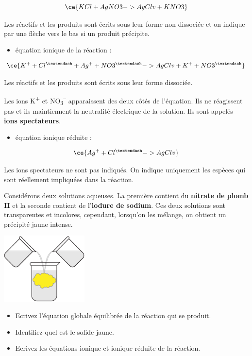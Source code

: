 \documentclass[
  11pt,
  french,
  a4paper,
  openany]{book}
\providecommand{\tightlist}{%
  \setlength{\itemsep}{0pt}\setlength{\parskip}{0pt}}
\begin{document}
\[ \ce{KCl + AgNO3 -> AgCl v + KNO3} \]

Les réactifs et les produits sont écrits sous leur forme non-dissociée et on indique par une flèche vers le bas si un produit précipite.

\begin{itemize}
\tightlist
\item
  équation ionique de la réaction :
\end{itemize}

\[ \ce{K^{+} + Cl^{–} + Ag^{+} + NO3^{–} -> AgCl v + K^{+} + NO3^{–}} \]

Les réactifs et les produits sont écrits sous leur forme dissociée.

Les ions K\textsuperscript{+} et NO\textsubscript{3}\textsuperscript{--} apparaissent des deux côtés de l'équation. Ils ne réagissent pas et ils maintiennent la neutralité électrique de la solution. Ils sont appelés \textbf{ions spectateurs}.

\begin{itemize}
\tightlist
\item
  équation ionique réduite :
\end{itemize}

\[ \ce{Ag^{+} + Cl^{–} -> AgCl v} \]

Les ions spectateurs ne sont pas indiqués. On indique uniquement les espèces qui sont réellement impliquées dans la réaction.

\begin{Exercise}

Considérons deux solutions aqueuses. La première contient du \textbf{nitrate de plomb II} et la seconde contient de l'\textbf{iodure de sodium}. Ces deux solutions sont transparentes et incolores, cependant, lorsqu'on les mélange, on obtient un précipité jaune intense.

\includegraphics[width=0.33\textwidth,height=\textheight]{images/precipitation.png}

\begin{itemize}
\tightlist
\item
  Ecrivez l'équation globale équilibrée de la réaction qui se produit.
\item
  Identifiez quel est le solide jaune.
\item
  Ecrivez les équations ionique et ionique réduite de la réaction.
\end{itemize}



\end{Exercise}
\end{document}
